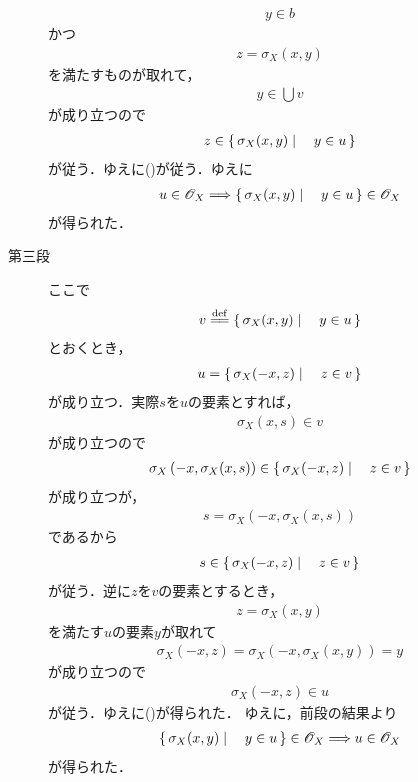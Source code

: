 \begin{sketch}
\begin{description}
\begin{align}
					y \in b
				\end{align}
				かつ
				\begin{align}
					z = \sigma_X(x,y)
				\end{align}
				を満たすものが取れて，
				\begin{align}
					y \in \bigcup v
				\end{align}
				が成り立つので
				\begin{align}
					z \in \left\{\, \sigma_X(x,y) \mid \quad y \in u\, \right\}
				\end{align}
				が従う．ゆえに()が従う．ゆえに
				\begin{align}
					u \in \mathscr{O}_X \Longrightarrow \left\{\, \sigma_X(x,y) \mid \quad y \in u\, \right\} \in \mathscr{O}_X
				\end{align}
				が得られた．
				
			\item[第三段]
				ここで
				\begin{align}
					v \defeq \Set{\sigma_X(x,y)}{y \in u}
				\end{align}
				とおくとき，
				\begin{align}
					u = \left\{\, \sigma_X(-x,z) \mid \quad z \in v\, \right\}
					\label{fom:thm_topology_induced_by_left_invariant_metric_is_invariant_3}
				\end{align}
				が成り立つ．実際$s$を$u$の要素とすれば，
				\begin{align}
					\sigma_X(x,s) \in v
				\end{align}
				が成り立つので
				\begin{align}
					\sigma_X\left(-x,\sigma_X(x,s)\right) \in \left\{\, \sigma_X(-x,z) \mid \quad z \in v\, \right\}
				\end{align}
				が成り立つが，
				\begin{align}
					s = \sigma_X\left(-x,\sigma_X(x,s)\right)
				\end{align}
				であるから
				\begin{align}
					s \in \left\{\, \sigma_X(-x,z) \mid \quad z \in v\, \right\}
				\end{align}
				が従う．逆に$z$を$v$の要素とするとき，
				\begin{align}
					z = \sigma_X\left(x,y\right)
				\end{align}
				を満たす$u$の要素$y$が取れて
				\begin{align}
					\sigma_X\left(-x,z\right)
					= \sigma_X\left(-x,\sigma_X\left(x,y\right)\right)
					= y
				\end{align}
				が成り立つので
				\begin{align}
					\sigma_X\left(-x,z\right) \in u
				\end{align}
				が従う．ゆえに()が得られた．
				ゆえに，前段の結果より
				\begin{align}
					\left\{\, \sigma_X(x,y) \mid \quad y \in u\, \right\} \in \mathscr{O}_X \Longrightarrow u \in \mathscr{O}_X
				\end{align}
				が得られた．
				\QED
		\end{description}
	\end{sketch}
	
